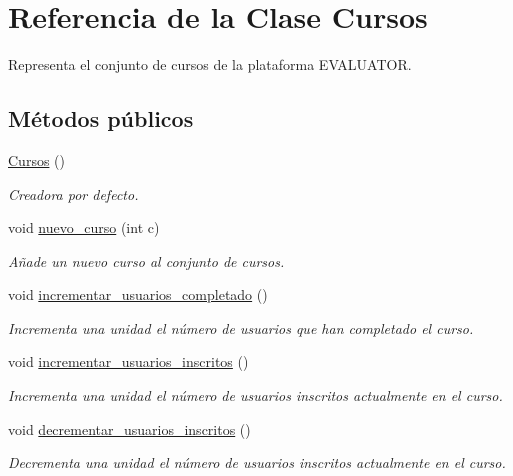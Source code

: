 \hypertarget{class_cursos}{}\section{Referencia de la Clase Cursos}
\label{class_cursos}


Representa el conjunto de cursos de la plataforma E\+V\+A\+L\+U\+A\+T\+OR.  


\subsection*{Métodos públicos}
\begin{DoxyCompactItemize}
\item 
\mbox{\hyperlink{class_cursos_acdb8d248e1a8ebe1aac747efa7b54cd4}{Cursos}} ()
\begin{DoxyCompactList}\small\item\em Creadora por defecto. \end{DoxyCompactList}\item 
void \mbox{\hyperlink{class_cursos_a64e6fd6a1d034b381b0377d098778dd9}{nuevo\+\_\+curso}} (int c)
\begin{DoxyCompactList}\small\item\em Añade un nuevo curso al conjunto de cursos. \end{DoxyCompactList}\item 
void \mbox{\hyperlink{class_cursos_a3ce8af0e0132939cf6f51a4321d58d7f}{incrementar\+\_\+usuarios\+\_\+completado}} ()
\begin{DoxyCompactList}\small\item\em Incrementa una unidad el número de usuarios que han completado el curso. \end{DoxyCompactList}\item 
void \mbox{\hyperlink{class_cursos_a8e05dcf1247f0123619b711a68ca4a66}{incrementar\+\_\+usuarios\+\_\+inscritos}} ()
\begin{DoxyCompactList}\small\item\em Incrementa una unidad el número de usuarios inscritos actualmente en el curso. \end{DoxyCompactList}\item 
void \mbox{\hyperlink{class_cursos_aa9b43f3b9380052878414fa4906b7925}{decrementar\+\_\+usuarios\+\_\+inscritos}} ()
\begin{DoxyCompactList}\small\item\em Decrementa una unidad el número de usuarios inscritos actualmente en el curso. \end{DoxyCompactList}\item 

\end{DoxyCompactItemize}
